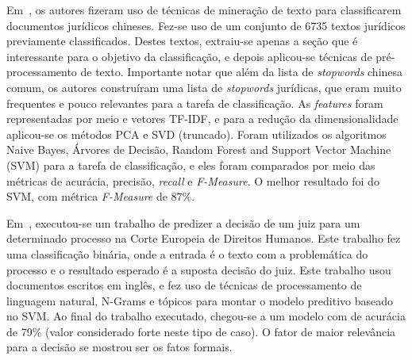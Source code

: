 
Em~\cite{chinese}, os autores fizeram uso de técnicas de mineração de texto para classificarem documentos jurídicos chineses. Fez-se uso de um conjunto de 6735 textos jurídicos previamente classificados. Destes textos, extraiu-se apenas a seção que é interessante para o objetivo da classificação, e depois aplicou-se técnicas de pré-processamento de texto. Importante notar que além da lista de \textit{stopwords} chinesa comum, os autores construíram uma lista de \textit{stopwords} jurídicas, que eram muito frequentes e pouco relevantes para a tarefa de classificação. As \textit{features} foram representadas por meio e vetores TF-IDF, e para a redução da dimensionalidade  aplicou-se os métodos PCA e SVD (truncado). 
Foram utilizados os algoritmos Naive Bayes, Árvores de Decisão, Random Forest and Support Vector Machine (SVM) para a tarefa de classificação, e eles foram comparados por meio das métricas de acurácia, precisão, \textit{recall} e \textit{F-Measure}. O melhor resultado foi do SVM, com métrica \textit{F-Measure} de 87\%.

Em~\cite{european_court}, executou-se um trabalho de predizer a decisão de um juiz para um determinado processo na Corte Europeia de Direitos Humanos. Este trabalho fez uma classificação binária, onde a entrada é o texto com a problemática do processo e o resultado esperado é a suposta decisão do juiz. Este trabalho usou documentos escritos em inglês, e fez uso de técnicas de processamento de linguagem natural, N-Grams e tópicos para montar o modelo preditivo baseado no SVM. Ao final do trabalho executado, chegou-se a um modelo com de acurácia de 79\% (valor considerado forte neste tipo de caso). O fator de maior relevância para a decisão se mostrou ser os fatos formais.





